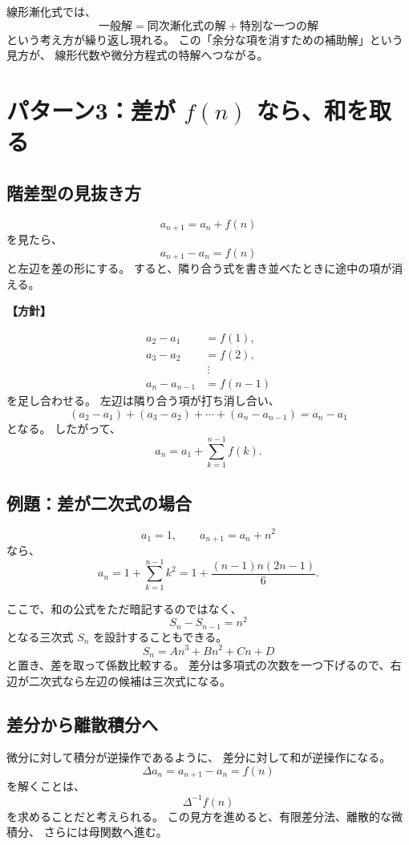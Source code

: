 線形漸化式では、
\[
  \text{一般解}
  =
  \text{同次漸化式の解}
  +
  \text{特別な一つの解}
\]
という考え方が繰り返し現れる。
この「余分な項を消すための補助解」という見方が、
線形代数や微分方程式の特解へつながる。

\section{パターン3：差が $f(n)$ なら、和を取る}

\subsection{階差型の見抜き方}

\[
  a_{n+1}=a_n+f(n)
\]
を見たら、
\[
  a_{n+1}-a_n=f(n)
\]
と左辺を差の形にする。
すると、隣り合う式を書き並べたときに途中の項が消える。

\noindent\textbf{【方針】}

\[
  \begin{aligned}
    a_2-a_1     & =f(1),   \\
    a_3-a_2     & =f(2),   \\
                & \ \vdots \\
    a_n-a_{n-1} & =f(n-1)
  \end{aligned}
\]
を足し合わせる。
左辺は隣り合う項が打ち消し合い、
\[
  (a_2-a_1)+(a_3-a_2)+\cdots+(a_n-a_{n-1})
  =a_n-a_1
\]
となる。
したがって、
\[
  \boxed{a_n=a_1+\sum_{k=1}^{n-1}f(k)}.
\]

\subsection{例題：差が二次式の場合}

\[
  a_1=1,\qquad a_{n+1}=a_n+n^2
\]
なら、
\[
  a_n=1+\sum_{k=1}^{n-1}k^2
  =1+\frac{(n-1)n(2n-1)}6.
\]

ここで、和の公式をただ暗記するのではなく、
\[
  S_n-S_{n-1}=n^2
\]
となる三次式 $S_n$ を設計することもできる。
\[
  S_n=An^3+Bn^2+Cn+D
\]
と置き、差を取って係数比較する。
差分は多項式の次数を一つ下げるので、右辺が二次式なら左辺の候補は三次式になる。

\subsection{差分から離散積分へ}

微分に対して積分が逆操作であるように、
差分に対して和が逆操作になる。
\[
  \Delta a_n=a_{n+1}-a_n=f(n)
\]
を解くことは、
\[
  \Delta^{-1}f(n)
\]
を求めることだと考えられる。
この見方を進めると、有限差分法、離散的な微積分、
さらには母関数へ進む。


